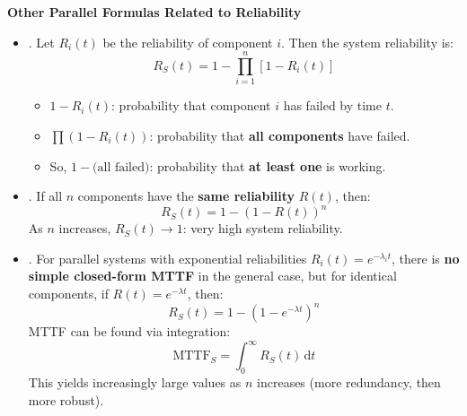 \begin{flushleft}
    \textcolor{Green3}{ \textbf{Other Parallel Formulas Related to Reliability}}
\end{flushleft}
\begin{itemize}
    \item {}. Let $R_{i}(t)$ be the reliability of component $i$. Then the system reliability is:
    \begin{equation*}
        R_S(t) = 1 - \displaystyle\prod_{i=1}^{n} \left[1 - R_i(t)\right]
    \end{equation*}
    \begin{itemize}
        \item $1 - R_i(t)$: probability that component $i$ has failed by time $t$.
        \item $\prod (1 - R_i(t))$: probability that \textbf{all components} have failed.
        \item So, $1 - \text{(all failed)}$: probability that \textbf{at least one} is working.
    \end{itemize}


    \item {}. If all $n$ components have the \textbf{same reliability} $R(t)$, then:
    \begin{equation}
        R_S(t) = 1 - \left(1 - R\left(t\right)\right)^{n}
    \end{equation}
    As $n$ increases, $R_S(t) \to 1$: very high system reliability.


    \item {}. For parallel systems with exponential reliabilities $R_i(t) = e^{-\lambda_{i} t}$, there is \textbf{no simple closed-form MTTF} in the general case, but for identical components, if $R(t) = e^{-\lambda t}$, then:
    \begin{equation}
        R_S(t) = 1 - \left(1 - e^{-\lambda t}\right)^{n}
    \end{equation}
    MTTF can be found via integration:
    \begin{equation}
        \text{MTTF}_S = \displaystyle\int_{0}^{\infty} R_S(t) \, \mathrm{d}t
    \end{equation}
    This yields increasingly large values as $n$ increases (more redundancy, then more robust).



\end{itemize}
